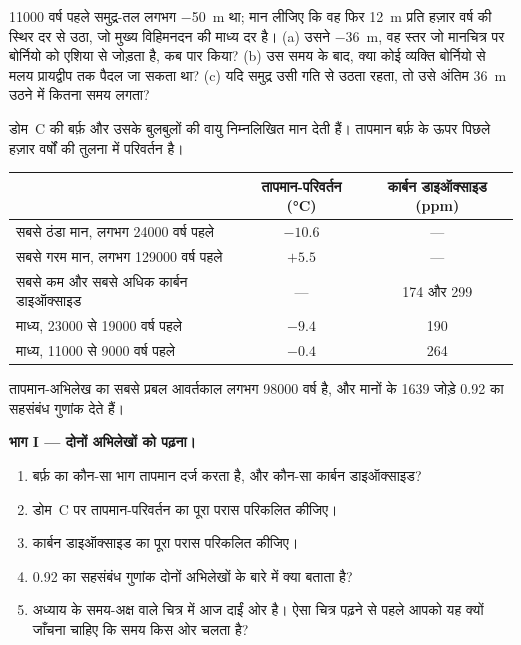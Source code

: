 \begin{exercise}[$\star\star\star$]\label{exo:g12:past-climates:15}
\num{11000} वर्ष पहले समुद्र-तल लगभग \qty{-50}{m} था; मान लीजिए कि वह फिर
\qty{12}{m} प्रति हज़ार वर्ष की स्थिर दर से उठा, जो मुख्य
विहिमनदन की माध्य दर है। (a) उसने \qty{-36}{m}, वह स्तर जो मानचित्र पर बोर्नियो को
एशिया से जोड़ता है, कब पार किया? (b) उस समय के बाद, क्या कोई व्यक्ति बोर्नियो से
मलय प्रायद्वीप तक पैदल जा सकता था? (c) यदि समुद्र उसी गति से उठता रहता, तो उसे अंतिम
\qty{36}{m} उठने में कितना समय लगता?
\end{exercise}

\begin{problem}[{सप्ताहांत समस्या --- अंटार्कटिक बर्फ़ के 800 000 वर्ष}]
\label{pb:g12:past-climates:1}
डोम~C की बर्फ़ और उसके बुलबुलों की वायु निम्नलिखित मान देती हैं।
तापमान बर्फ़ के ऊपर पिछले हज़ार वर्षों की तुलना में परिवर्तन है।

\begin{center}
\small
\begin{tabular}{|l|c|c|}
\hline
 & \textbf{तापमान-परिवर्तन (\unit{\degreeCelsius})} & \textbf{कार्बन डाइऑक्साइड (ppm)} \\
\hline
सबसे ठंडा मान, लगभग \num{24000} वर्ष पहले & $-10.6$ & --- \\
सबसे गरम मान, लगभग \num{129000} वर्ष पहले & $+5.5$ & --- \\
सबसे कम और सबसे अधिक कार्बन डाइऑक्साइड & --- & 174 और 299 \\
माध्य, \num{23000} से \num{19000} वर्ष पहले & $-9.4$ & 190 \\
माध्य, \num{11000} से \num{9000} वर्ष पहले & $-0.4$ & 264 \\
\hline
\end{tabular}
\end{center}

तापमान-अभिलेख का सबसे प्रबल आवर्तकाल लगभग \num{98000} वर्ष है,
और मानों के 1639 जोड़े 0.92 का सहसंबंध गुणांक देते हैं।

\medskip
\noindent\textbf{भाग I --- दोनों अभिलेखों को पढ़ना।}
\begin{enumerate}
  \item बर्फ़ का कौन-सा भाग तापमान दर्ज करता है, और कौन-सा
        कार्बन डाइऑक्साइड?
  \item डोम~C पर तापमान-परिवर्तन का पूरा परास परिकलित कीजिए।
  \item कार्बन डाइऑक्साइड का पूरा परास परिकलित कीजिए।
  \item 0.92 का सहसंबंध गुणांक दोनों अभिलेखों के बारे में क्या
        बताता है?
  \item अध्याय के समय-अक्ष वाले चित्र में आज दाईं ओर है। ऐसा चित्र पढ़ने से पहले
        आपको यह क्यों जाँचना चाहिए कि समय किस ओर चलता है?
\end{enumerate}


\end{problem}
